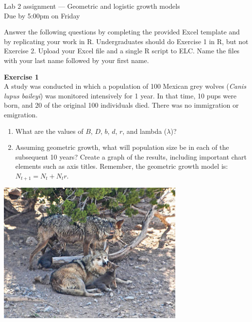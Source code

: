 \documentclass[12pt]{article}\usepackage[]{graphicx}\usepackage[]{xcolor}
\begin{document}
{
  \Large
  \centering
  Lab 2 assignment --- Geometric and logistic growth models \\
  Due by 5:00pm on Friday \par
}

Answer the following questions by completing the provided Excel 
template and by replicating your work in R. Undergraduates should do
Exercise 1 in R, but not Exercise 2. Upload your Excel file and a
single R script to ELC. Name the files with your last
name followed by your first name. \\ 

\vspace{12pt}

{\bf Exercise 1 \\}
A study was conducted in which a population of 100 Mexican grey wolves
({\it Canis lupus baileyi}) was monitored intensively for 1 year. In
that time, 10 pups were born, and 20 of the original 100 individuals 
died. There was no immigration or emigration.  

\begin{enumerate}
  \item What are the values of $B$, $D$, $b$, $d$, $r$, and lambda
    ($\lambda$)?
  \item Assuming geometric growth, what will population size be in
    each of the subsequent 10 years? Create a graph of the results,
    including important chart elements such as axis titles. Remember,
    the geometric growth model is: $N_{t+1} = N_t + N_t r$.
\end{enumerate}

\vspace{24pt}

{
  \centering
  \includegraphics[width=0.7\textwidth]{figs/Coronadopack2} \\
}


\clearpage
\end{document}
